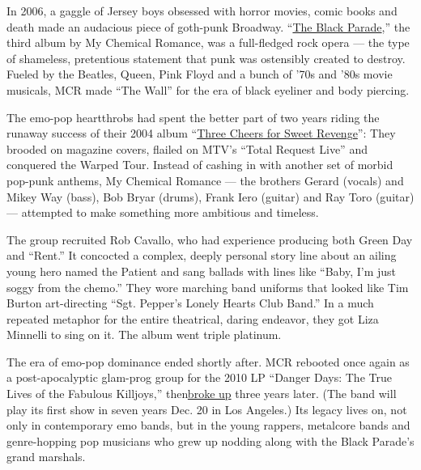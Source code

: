 In 2006, a gaggle of Jersey boys obsessed with horror movies, comic
books and death made an audacious piece of goth-punk Broadway.
``\href{https://www.nytimes3xbfgragh.onion/2006/10/22/arts/music/22mich.html}{The
Black Parade},'' the third album by My Chemical Romance, was a
full-fledged rock opera --- the type of shameless, pretentious statement
that punk was ostensibly created to destroy. Fueled by the Beatles,
Queen, Pink Floyd and a bunch of '70s and '80s movie musicals, MCR made
``The Wall'' for the era of black eyeliner and body piercing.

The emo-pop heartthrobs had spent the better part of two years riding
the runaway success of their 2004 album
``\href{https://www.nytimes3xbfgragh.onion/2004/06/07/arts/critic-s-choice-new-cd-s-raw-riffs-and-sentiment-but-not-lacking-sizzle.html}{Three
Cheers for Sweet Revenge}'': They brooded on magazine covers, flailed on
MTV's ``Total Request Live'' and conquered the Warped Tour. Instead of
cashing in with another set of morbid pop-punk anthems, My Chemical
Romance --- the brothers Gerard (vocals) and Mikey Way (bass), Bob Bryar
(drums), Frank Iero (guitar) and Ray Toro (guitar) --- attempted to make
something more ambitious and timeless.

The group recruited Rob Cavallo, who had experience producing both Green
Day and ``Rent.'' It concocted a complex, deeply personal story line
about an ailing young hero named the Patient and sang ballads with lines
like ``Baby, I'm just soggy from the chemo.'' They wore marching band
uniforms that looked like Tim Burton art-directing ``Sgt. Pepper's
Lonely Hearts Club Band.'' In a much repeated metaphor for the entire
theatrical, daring endeavor, they got Liza Minnelli to sing on it. The
album went triple platinum.

The era of emo-pop dominance ended shortly after. MCR rebooted once
again as a post-apocalyptic glam-prog group for the 2010 LP ``Danger
Days: The True Lives of the Fabulous Killjoys,''
then\href{https://web.archive.org/web/20130325024121/http://www.mychemicalromance.com/blog/mcr/my-chemical-romance}{}\href{https://web.archive.org/web/20130325024121/http://www.mychemicalromance.com/blog/mcr/my-chemical-romance}{broke
up} three years later. (The band will play its first show in seven years
Dec. 20 in Los Angeles.) Its legacy lives on, not only in contemporary
emo bands, but in the young rappers, metalcore bands and genre-hopping
pop musicians who grew up nodding along with the Black Parade's grand
marshals.

